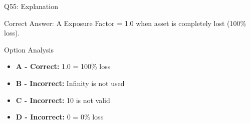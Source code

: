 \documentclass{beamer}
\begin{document}
	\begin{frame}{Q55: Explanation}
		\begin{block}{Correct Answer: A}
			Exposure Factor = 1.0 when asset is completely lost (100\% loss).
		\end{block}
		\begin{block}{Option Analysis}
			\begin{itemize}
				\item \textbf{A - Correct:} 1.0 = 100\% loss
				\item \textbf{B - Incorrect:} Infinity is not used
				\item \textbf{C - Incorrect:} 10 is not valid
				\item \textbf{D - Incorrect:} 0 = 0\% loss
			\end{itemize}
		\end{block}
	\end{frame}
	
	
	
	
\end{document}
